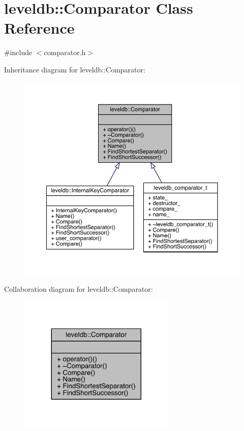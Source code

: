 \hypertarget{structleveldb_1_1_comparator}{}\section{leveldb\+::Comparator Class Reference}
\label{structleveldb_1_1_comparator}


{\ttfamily \#include $<$comparator.\+h$>$}



Inheritance diagram for leveldb\+::Comparator\+:
\nopagebreak
\begin{figure}[H]
\begin{center}
\leavevmode
\includegraphics[width=350pt]{structleveldb_1_1_comparator__inherit__graph}
\end{center}
\end{figure}


Collaboration diagram for leveldb\+::Comparator\+:
\nopagebreak
\begin{figure}[H]
\begin{center}
\leavevmode
\includegraphics[width=212pt]{structleveldb_1_1_comparator__coll__graph}
\end{center}
\end{figure}
